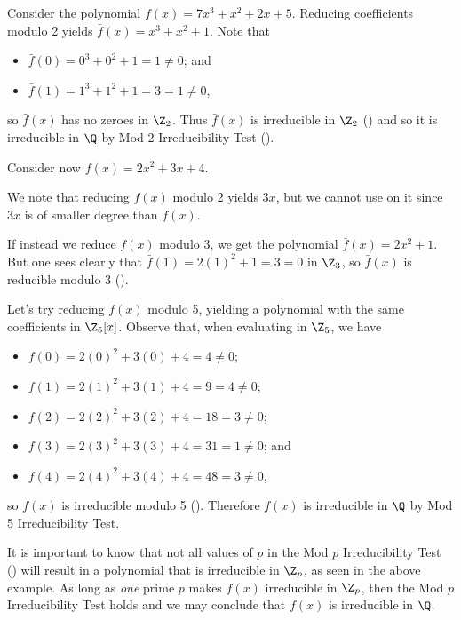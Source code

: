 \begin{example}
    Consider the polynomial $f(x) = 7x^3 + x^2 + 2x + 5$. Reducing coefficients modulo 2 yields $\bar{f}(x) = x^3 + x^2 + 1$. Note that
    \begin{itemize}
        \item $\bar{f}(0) = 0^3 + 0^2 + 1 = 1 \neq 0$; and
        \item $\bar{f}(1) = 1^3 + 1^2 + 1 = 3 = 1 \neq 0$,
    \end{itemize}
    so $\bar{f}(x)$ has no zeroes in $\Z_2$. Thus $\bar{f}(x)$ is irreducible in $\Z_2$ () and so it is irreducible in $\Q$ by Mod 2 Irreducibility Test ().
\end{example}
\begin{example}
    Consider now $f(x) = 2x^2 + 3x + 4$.
    
    We note that reducing $f(x)$ modulo 2 yields $3x$, but we cannot use  on it since $3x$ is of smaller degree than $f(x)$.

    If instead we reduce $f(x)$ modulo 3, we get the polynomial $\bar{f}(x) = 2x^2 + 1$. But one sees clearly that $\bar{f}(1) = 2(1)^2 + 1 = 3 = 0$ in $\Z_3$, so $\bar{f}(x)$ is reducible modulo 3 ().

    Let's try reducing $f(x)$ modulo 5, yielding a polynomial with the same coefficients in $\Z_5[x]$. Observe that, when evaluating in $\Z_5$, we have
    \begin{itemize}
        \item $f(0) = 2(0)^2 + 3(0) + 4 = 4 \neq 0$;
        \item $f(1) = 2(1)^2 + 3(1) + 4 = 9 = 4 \neq 0$;
        \item $f(2) = 2(2)^2 + 3(2) + 4 = 18 = 3 \neq 0$;
        \item $f(3) = 2(3)^2 + 3(3) + 4 = 31 = 1 \neq 0$; and
        \item $f(4) = 2(4)^2 + 3(4) + 4 = 48 = 3 \neq 0$,
    \end{itemize}
    so $f(x)$ is irreducible modulo 5 (). Therefore $f(x)$ is irreducible in $\Q$ by Mod 5 Irreducibility Test.
\end{example}

It is important to know that not all values of $p$ in the Mod $p$ Irreducibility Test () will result in a polynomial that is irreducible in $\Z_p$, as seen in the above example. As long as \textit{one} prime $p$ makes $f(x)$ irreducible in $\Z_p$, then the Mod $p$ Irreducibility Test holds and we may conclude that $f(x)$ is irreducible in $\Q$.

